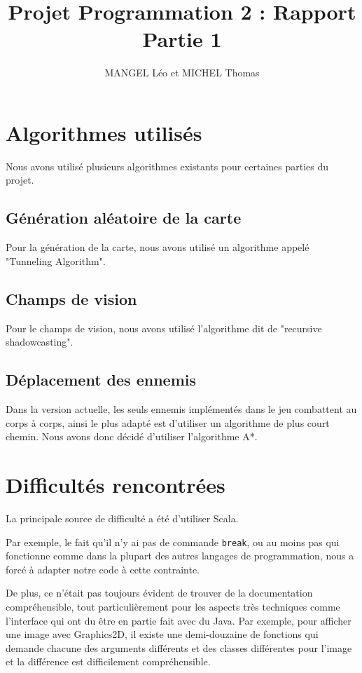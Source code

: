 \documentclass[10pt,a4paper]{article}
\title{Projet Programmation 2 : Rapport Partie 1}
\author{MANGEL Léo et MICHEL Thomas}
\date{}
\begin{document}
\maketitle

\section{Algorithmes utilisés}

Nous avons utilisé plusieurs algorithmes existants pour certaines parties du projet. 

\subsection{Génération aléatoire de la carte}

Pour la génération de la carte, nous avons utilisé un algorithme appelé "Tunneling Algorithm".

\subsection{Champs de vision}

Pour le champs de vision, nous avons utilisé l'algorithme dit de "recursive shadowcasting".

\subsection{Déplacement des ennemis}

Dans la version actuelle, les seuls ennemis implémentés dans le jeu combattent au corps à corps, ainsi le plus adapté est d'utiliser un algorithme de plus court chemin. Nous avons donc décidé d'utiliser l'algorithme A*.

\section{Difficultés rencontrées}

La principale source de difficulté a été d'utiliser Scala.

Par exemple, le fait qu'il n'y ai pas de commande \texttt{break}, ou au moins pas qui fonctionne comme dans la plupart des autres langages de programmation, nous a forcé à adapter notre code à cette contrainte.

De plus, ce n'était pas toujours évident de trouver de la documentation compréhensible, tout particulièrement pour les aspects très techniques comme l'interface qui ont du être en partie fait avec du Java. Par exemple, pour afficher une image avec Graphics2D, il existe une demi-douzaine de fonctions qui demande chacune des arguments différents et des classes différentes pour l'image et la différence est difficilement compréhensible.
\end{document}
